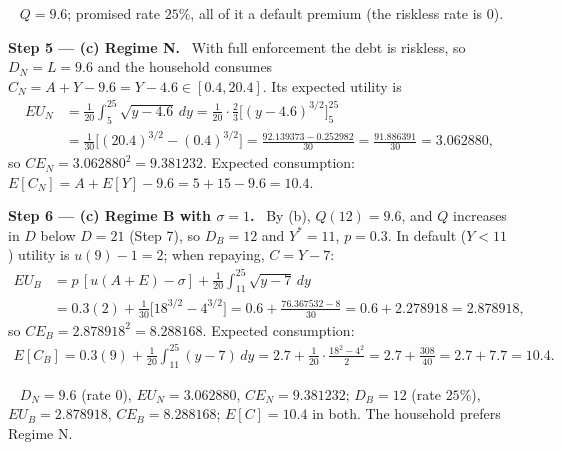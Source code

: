 \documentclass[11pt,a4paper]{article}
\newcommand{\step}[2]{\par\medskip\noindent\textbf{Step #1 --- #2.}~}
\newcommand{\answer}[1]{\par\smallskip\noindent\fbox{\textbf{Answer #1.}}~}
\begin{document}
\answer{(b)} $Q=9.6$; promised rate $25\%$, all of it a default premium (the riskless rate is $0$).

\step{5}{(c) Regime N} With full enforcement the debt is riskless, so $D_N=L=9.6$ and the household consumes
$C_N=A+Y-9.6=Y-4.6\in[0.4,20.4]$. Its expected utility is
\begin{align}
  EU_N &= \frac1{20}\int_5^{25}\sqrt{y-4.6}\,dy = \frac1{20}\cdot\frac23\Big[(y-4.6)^{3/2}\Big]_5^{25} \nonumber\\
       &= \frac1{30}\big[(20.4)^{3/2}-(0.4)^{3/2}\big] = \frac{92.139373-0.252982}{30} = \frac{91.886391}{30} = 3.062880, \label{t4e17-EUN}
\end{align}
so $CE_N=3.062880^2=9.381232$. Expected consumption: $E[C_N]=A+E[Y]-9.6=5+15-9.6=10.4$.

\step{6}{(c) Regime B with $\sigma=1$} By (b), $Q(12)=9.6$, and $Q$ increases in $D$ below $D=21$ (Step 7), so
$D_B=12$ and $Y^*=11$, $p=0.3$. In default ($Y<11$) utility is $u(9)-1=2$; when repaying, $C=Y-7$:
\begin{align}
  EU_B &= p\,[u(A+E)-\sigma] + \frac1{20}\int_{11}^{25}\sqrt{y-7}\,dy \nonumber\\
       &= 0.3(2) + \frac1{30}\big[18^{3/2}-4^{3/2}\big] = 0.6+\frac{76.367532-8}{30} = 0.6+2.278918 = 2.878918, \label{t4e17-EUB1}
\end{align}
so $CE_B=2.878918^2=8.288168$. Expected consumption:
\begin{align}
  E[C_B] = 0.3(9)+\frac1{20}\int_{11}^{25}(y-7)\,dy = 2.7+\frac1{20}\cdot\frac{18^2-4^2}{2} = 2.7+\frac{308}{40}=2.7+7.7=10.4. \nonumber
\end{align}

\answer{(c)} $D_N=9.6$ (rate $0$), $EU_N=3.062880$, $CE_N=9.381232$; $D_B=12$ (rate $25\%$),
$EU_B=2.878918$, $CE_B=8.288168$; $E[C]=10.4$ in both. The household prefers Regime N.
\end{document}
